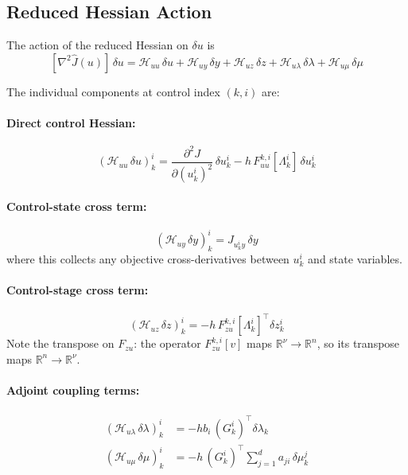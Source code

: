 \documentclass[11pt]{article}
\newcommand{\RR}{\mathbb{R}}
\newcommand{\tp}{^\top}
\newcommand{\pder}[2]{\frac{\partial #1}{\partial #2}}
\begin{document}
\subsection{Reduced Hessian Action}

The action of the reduced Hessian on $\delta u$ is
\begin{equation}
\label{eqn:hessian_action}
\boxed{
[\nabla^2\hat{J}(u)]\,\delta u = \mathcal{H}_{uu}\,\delta u + \mathcal{H}_{uy}\,\delta y + \mathcal{H}_{uz}\,\delta z + \mathcal{H}_{u\lambda}\,\delta\lambda + \mathcal{H}_{u\mu}\,\delta\mu
}
\end{equation}

The individual components at control index $(k,i)$ are:

\paragraph{Direct control Hessian:}
\begin{equation}
(\mathcal{H}_{uu}\,\delta u)_k^i = \pder{^2 J}{(u_k^i)^2}\,\delta u_k^i - h\, F_{uu}^{k,i}[\Lambda_k^i]\,\delta u_k^i
\end{equation}

\paragraph{Control-state cross term:}
\begin{equation}
(\mathcal{H}_{uy}\,\delta y)_k^i = J_{u_k^i y}\,\delta y
\end{equation}
where this collects any objective cross-derivatives between $u_k^i$ and state variables.

\paragraph{Control-stage cross term:}
\begin{equation}
(\mathcal{H}_{uz}\,\delta z)_k^i = -h\, F_{zu}^{k,i}[\Lambda_k^i]\tp \delta z_k^i
\end{equation}
Note the transpose on $F_{zu}$: the operator $F_{zu}^{k,i}[v]$ maps $\RR^\nu\to\RR^n$, so its transpose maps $\RR^n\to\RR^\nu$.

\paragraph{Adjoint coupling terms:}
\begin{align}
(\mathcal{H}_{u\lambda}\,\delta\lambda)_k^i &= -h b_i\, (G_k^i)\tp \delta\lambda_k \\[4pt]
(\mathcal{H}_{u\mu}\,\delta\mu)_k^i &= -h\, (G_k^i)\tp \sum_{j=1}^d a_{ji}\, \delta\mu_k^j
\end{align}
\end{document}
